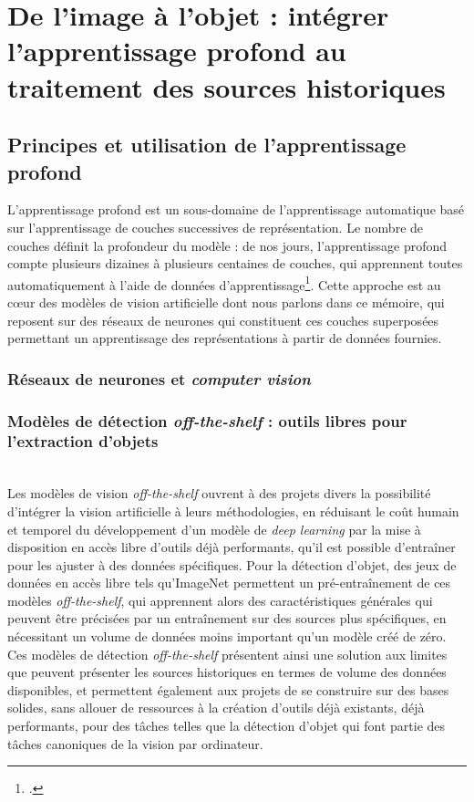 \documentclass[a4paper,12pt,twoside]{book}
\newcommand{\clearemptydoublepage}{\newpage{\pagestyle{empty}\cleardoublepage}}
\begin{document}
    \part{De l’image à l’objet : intégrer l’apprentissage profond au traitement des sources historiques}
        \chapter[L'apprentissage profond]{Principes et utilisation de l’apprentissage profond}
        L'apprentissage profond est un sous-domaine de l'apprentissage automatique basé sur l'apprentissage de couches successives de représentation. Le nombre de couches définit la profondeur du modèle : de nos jours, l'apprentissage profond compte plusieurs dizaines à plusieurs centaines de couches, qui apprennent toutes automatiquement à l'aide de données d'apprentissage\footcite{cholletApprentissageProfondAvec2020a}. Cette approche est au cœur des modèles de vision artificielle dont nous parlons dans ce mémoire, qui reposent sur des réseaux de neurones qui constituent ces couches superposées permettant un apprentissage des représentations à partir de données fournies.
        
            \section{\label{neuralNets}Réseaux de neurones et \textit{computer vision}}
                
        
            \section[Modèles de vision \textit{off-the-shelf}]{Modèles de détection \textit{off-the-shelf} : outils libres pour l'extraction d’objets}
                
        	\\
		
		Les modèles de vision \textit{off-the-shelf} ouvrent à des projets divers la possibilité d'intégrer la vision artificielle à leurs méthodologies, en réduisant le coût humain et temporel du développement d'un modèle de \textit{deep learning} par la mise à disposition en accès libre d'outils déjà performants, qu'il est possible d'entraîner pour les ajuster à des données spécifiques. Pour la détection d'objet, des jeux de données en accès libre tels qu'ImageNet permettent un pré-entraînement de ces modèles \textit{off-the-shelf}, qui apprennent alors des caractéristiques générales qui peuvent être précisées par un entraînement sur des sources plus spécifiques, en nécessitant un volume de données moins important qu'un modèle créé de zéro. Ces modèles de détection \textit{off-the-shelf} présentent ainsi une solution aux limites que peuvent présenter les sources historiques en termes de volume des données disponibles, et permettent également aux projets de se construire sur des bases solides, sans allouer de ressources à la création d'outils déjà existants, déjà performants, pour des tâches telles que la détection d'objet qui font partie des tâches canoniques de la vision par ordinateur.
        \clearemptydoublepage
        
\end{document}
